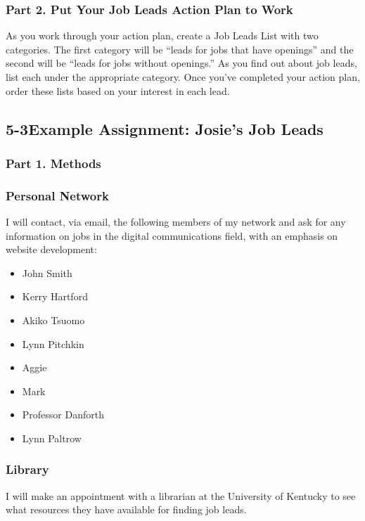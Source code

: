 \subsubsection*{Part 2. Put Your Job Leads Action Plan to Work}

As you work through your action plan, create a Job Leads List with two categories. The first category will be ``leads for jobs that have openings'' and the second will be ``leads for jobs without openings.'' As you find out about job leads, list each under the appropriate category. Once you've completed your action plan, order these lists based on your interest in each lead.

\pagebreak \subsection*{5-3\quad Example Assignment: Josie's Job Leads}
\subsubsection*{Part 1. Methods}

\subsubsection*{Personal Network}

I will contact, via email, the following members of my network and ask for any information on jobs in the digital communications field, with an emphasis on website development:
\begin{itemize}
	\item John Smith
	\item Kerry Hartford
	\item Akiko Tsuomo
	\item Lynn Pitchkin
	\item Aggie
	\item Mark
	\item Professor Danforth
	\item Lynn Paltrow
\end{itemize}
\subsubsection*{Library}

I will make an appointment with a librarian at the University of Kentucky to see what resources they have available for finding job leads.

